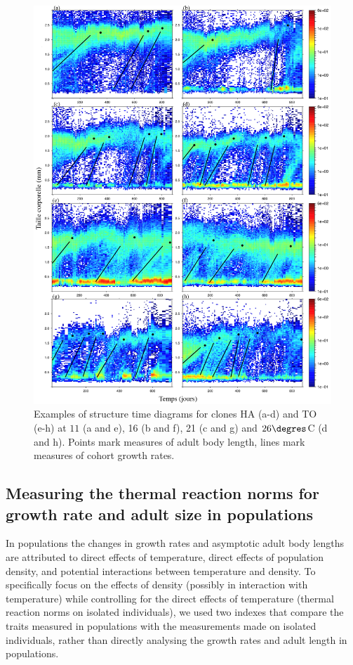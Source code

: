 \begin{figure}[H]
\begin{center}
\includegraphics[width=\textwidth]{1_CorpsDeThese/Resumes/Fig/FIP02}
\caption[Examples of
structure time diagrams]{Examples of
structure time diagrams for clones
HA (a-d) and TO (e-h) at $11$ (a and e), 16 (b and f), 21 (c and g) and
$26\degres$C (d and h). Points mark measures of adult body length, lines mark
measures of cohort growth rates.}
\label{fig:AnFIP2}
\end{center}
\end{figure}

\subsection{Measuring the thermal reaction norms for growth rate and adult size
in populations}

In populations the changes in growth rates and asymptotic adult body lengths are
attributed to direct effects of temperature, direct effects of population
density, and potential interactions between temperature and density. To
specifically focus on the effects of density (possibly in interaction with
temperature) while controlling for the direct effects of temperature (thermal
reaction norms on isolated individuals), we used two indexes that compare the
traits measured in populations with the measurements made on isolated
individuals, rather than directly analysing the growth rates and adult length in
populations.

